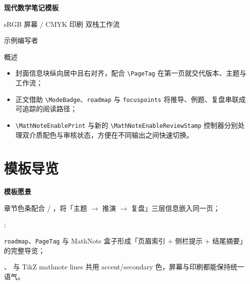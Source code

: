 \documentclass[a4paper,11pt]{ctexart}
\renewcommand{\notetitle}{现代数学笔记模板}
\renewcommand{\noteauthor}{示例编写者}
\renewcommand{\notesubtitle}{sRGB 屏幕 / CMYK 印刷 双栈工作流}
\newcommand{\TemplateMiniHeading}[1]{%
  \par\smallskip%
  \noindent\textbf{#1}\par\smallskip%
}
\begin{document}
\thispagestyle{empty}

\setcounter{page}{1}

\noindent
\begin{minipage}[t][0.7\textheight][c]{\textwidth}
  \raggedleft
  \vspace*{\fill}
  {\sffamily\bfseries\Huge\color{accent}\notetitle\par}
  \vspace{0.6em}
  {\Large\color{inkgray}\notesubtitle\par}
  \vspace{0.5em}
  {\large\color{inkgray}\noteauthor\par}
  \vspace{0.4em}
  \MathNoteVersionBlock
  \vspace*{\fill}
\end{minipage}

\begin{center}
\begin{minipage}{0.82\textwidth}
\textcolor{inkgray}{\sffamily\small 概述}\\
\begin{itemize}
  \item 封面信息块纵向居中且右对齐，配合 \texttt{\textbackslash PageTag} 在第一页就交代版本、主题与工作流；
  \item 正文借助 \texttt{\textbackslash ModeBadge}、\texttt{roadmap} 与 \texttt{focuspoints} 将推导、例题、复盘串联成可追踪的阅读路径；
  \item \texttt{\textbackslash MathNoteEnablePrint} 与新的 \texttt{\textbackslash MathNoteEnableReviewStamp} 控制器分别处理双介质配色与审核状态，方便在不同输出之间快速切换。
\end{itemize}
\end{minipage}
\end{center}
\vspace{1em}

\clearpage
\thispagestyle{plain}
\tableofcontents

\clearpage
\section{模板导览}

\TemplateMiniHeading{模板愿景}
\begin{description}[style=multiline, labelwidth=2.6cm, labelsep=0.9em, leftmargin=3.5cm]
  \item[{\ModeBadge{清晰层级}}] 章节色条配合  / ，将「主题 \(\rightarrow\) 推演 \(\rightarrow\) 复盘」三层信息嵌入同一页；
  \item[{\ModeBadge{现代配色}}] ;
  \item[{\ModeBadge{结构完备}}] \texttt{roadmap}、\texttt{PageTag} 与 MathNote 盒子形成「页眉索引 + 侧栏提示 + 结尾摘要」的完整导览；
  \item[{\ModeBadge{重点突出}}] 、 与 TikZ mathnote lines 共用 accent/\allowbreak secondary 色，屏幕与印刷都能保持统一语气。
\end{description}
\end{document}
